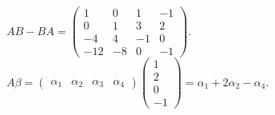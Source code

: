 		 $AB - BA = \begin{pmatrix}
				 1   & 0  & 1  & -1 \\
				 0   & 1  & 3  & 2  \\
				 -4  & 4  & -1 & 0  \\
				 -12 & -8 & 0  & -1
			 \end{pmatrix}$.
		 $A\beta = \begin{pmatrix}
				 \alpha_1 & \alpha_2 & \alpha_3 & \alpha_4
			 \end{pmatrix}
			 \begin{pmatrix}
				 1 \\
				 2 \\
				 0 \\
				 -1
			 \end{pmatrix} = \alpha_1 + 2\alpha_2 - \alpha_4$.



